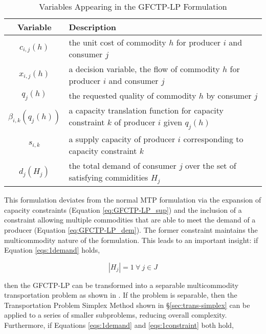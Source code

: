 \begin{table} [h!]
\centering
\begin{tabularx}{\textwidth-20pt}{|c|X|} %
\hline
Variable    & Description \\
\hline
$c_{i,j}(h)$             & the unit cost of commodity $h$ 
                         for producer $i$ and consumer $j$  \\
$x_{i,j}(h)$             & a decision variable, the flow of commodity $h$ 
                         for producer $i$ and consumer $j$  \\
$q_{j}(h)$               & the requested quality of commodity $h$ 
                         by consumer $j$  \\
$\beta_{i,k}(q_{j}(h))$  & a capacity translation function for capacity 
                         constraint $k$ of producer $i$ given $q_{j}(h)$ \\
$s_{i,k}$                & a supply capacity of producer $i$ corresponding to 
                         capacity constraint $k$ \\
$d_{j}(H_{j})$           & the total demand of consumer $j$ over the set of 
                         satisfying commidities $H_{j}$ \\
\hline
\end{tabularx}
\caption{Variables Appearing in the GFCTP-LP Formulation}
\label{tbl:GFCTP-LP-vars}
\end{table}

This formulation deviates from the normal MTP formulation via the expansion of
capacity constraints (Equation \ref{eq:GFCTP-LP_sup}) and the inclusion of a
constraint allowing multiple commodities that are able to meet the demand of a
producer (Equation \ref{eq:GFCTP-LP_dem}). The former constraint maintains the
multicommodity nature of the formulation. This leads to an important insight: if
Equation \ref{eqs:1demand} holds,

\begin{equation}\label{eqs:1demand}
  \left|{H_{j}}\right| = 1 \: \forall \: j \in J
\end{equation}

then the GFCTP-LP can be transformed into a separable multicommodity
transportation problem as shown in \cite{bertsekas_network_1998}. If the problem
is separable, then the Transportation Problem Simplex Method shown in
\S\ref{sec:trans-simplex} can be applied to a series of smaller subproblems,
reducing overall complexity. Furthermore, if Equations \ref{eqs:1demand} and
\ref{eqs:1constraint} both hold,

